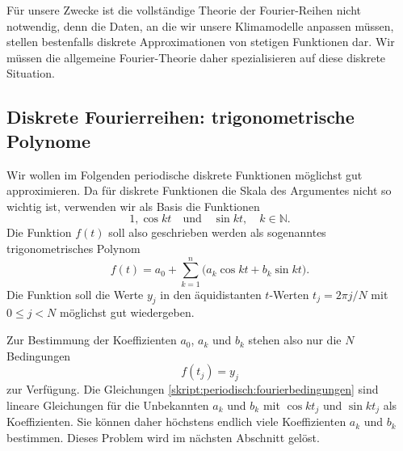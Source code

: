 Für unsere Zwecke ist die vollständige Theorie der Fourier-Reihen nicht
notwendig, denn die Daten, an die wir unsere Klimamodelle anpassen
müssen, stellen bestenfalls diskrete Approximationen von stetigen
Funktionen dar.
Wir müssen die allgemeine Fourier-Theorie daher spezialisieren auf diese
diskrete Situation.

\subsection{Diskrete Fourierreihen: trigonometrische Polynome}
Wir wollen im Folgenden periodische diskrete Funktionen möglichst gut
approximieren.
Da für diskrete Funktionen die Skala des Argumentes nicht so wichtig ist,
verwenden wir als Basis die Funktionen 
\begin{equation}
1,\cos kt\quad\text{und}\quad \sin kt,\quad k\in\mathbb N.
\end{equation}
Die Funktion $f(t)$ soll also geschrieben werden als sogenanntes 
trigonometrisches Polynom
\begin{equation}
f(t)
=
a_0 + \sum_{k=1}^n \bigl(a_k \cos kt + b_k\sin kt).
\label{skript:fourier:rekonstruktion}
\end{equation}
Die Funktion soll die Werte $y_j$ in den äquidistanten $t$-Werten 
$t_j=2\pi j/N$ mit $0\le j<N$ möglichst gut wiedergeben.

Zur Bestimmung der Koeffizienten $a_0$, $a_k$ und $b_k$ stehen also nur
die $N$ Bedingungen
\begin{equation}
f(t_j)=y_j
\label{skript:periodisch:fourierbedingungen}
\end{equation}
zur Verfügung.
Die Gleichungen \eqref{skript:periodisch:fourierbedingungen} sind
lineare Gleichungen für die Unbekannten $a_k$ und $b_k$ mit
$\cos kt_j$ und $\sin kt_j$ als Koeffizienten.
Sie können daher höchstens endlich viele Koeffizienten $a_k$ und $b_k$
bestimmen.
Dieses Problem wird im nächsten Abschnitt gelöst.





